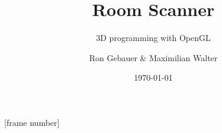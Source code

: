 \makeatletter
\makeatother

\usepackage[ngerman]{babel}
\usepackage[utf8]{inputenc}
\usepackage{amsmath,amsfonts,amssymb}

\usepackage{graphicx}
\usepackage{hyperref}

\usepackage{pgfpages}
\usepackage{handoutWithNotes}




[frame number]
\makeatletter
\makeatother


\title[RoomScan]{Room Scanner}
\subtitle[GRAP]{3D programming with OpenGL}

\author[RG \& MW]{Ron Gebauer \& Maximilian Walter}

\date[\today]{\today}



\subject{Created in Android for Vuzix M100}
